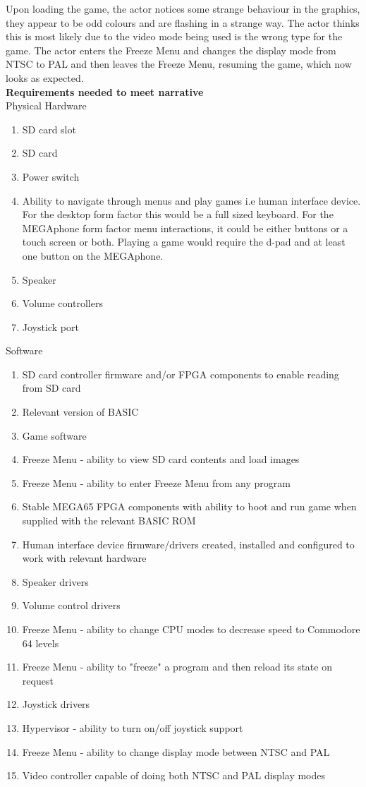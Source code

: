 Upon loading the game, the actor notices some strange behaviour in the graphics, they appear to be odd colours and are flashing in a strange way. The actor thinks this is most likely due to the video mode being used is the wrong type for the game. The actor enters the Freeze Menu and changes the display mode from NTSC to PAL and then leaves the Freeze Menu, resuming the game, which now looks as expected.\\

\textbf{Requirements needed to meet narrative}\\
Physical Hardware
\begin{enumerate}
\item SD card slot
\item SD card
\item Power switch
\item Ability to navigate through menus and play games i.e human interface device. For the desktop form factor this would be a full sized keyboard. For the MEGAphone form factor menu interactions, it could be either buttons or a touch screen or both. Playing a game would require the d-pad and at least one button on the MEGAphone.
\item Speaker
\item Volume controllers
\item Joystick port
\end{enumerate}

Software\\
\begin{enumerate}
\item SD card controller firmware and/or FPGA components to enable reading from SD card
\item Relevant version of BASIC 
\item Game software
\item Freeze Menu - ability to view SD card contents and load images
\item Freeze Menu - ability to enter Freeze Menu from any program
\item Stable MEGA65 FPGA components with ability to boot and run game when supplied with the relevant BASIC ROM
\item Human interface device firmware/drivers created, installed and configured to work with relevant hardware
\item Speaker drivers
\item Volume control drivers 
\item Freeze Menu - ability to change CPU modes to decrease speed to Commodore 64 levels
\item Freeze Menu - ability to "freeze" a program and then reload its state on request
\item Joystick drivers
\item Hypervisor - ability to turn on/off joystick support
\item Freeze Menu - ability to change display mode between NTSC and PAL
\item Video controller capable of doing both NTSC and PAL display modes
\end{enumerate}

